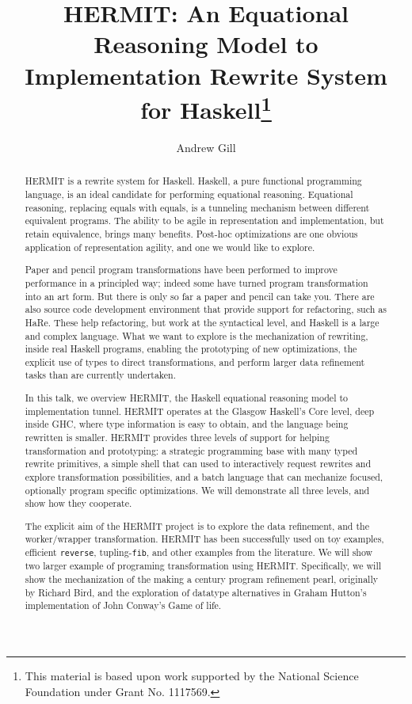 \documentclass[a4paper,UKenglish]{oasics}
\title{HERMIT: An Equational Reasoning Model to Implementation Rewrite System for Haskell\footnote{This material is based upon work supported by the National Science Foundation under Grant No. 1117569.}}
\author[1]{Andrew Gill}
\affil[1]{Information Technology and Telecommunication Center,\\
Department of Electrical Engineering and Computer Science,\\
The University of Kansas, USA\\
\texttt{andygill@ku.edu}}
\begin{document}
\maketitle

\begin{abstract}
HERMIT is a rewrite system for Haskell.
%
Haskell, a pure functional programming language,
is an ideal candidate for performing equational reasoning.
%
Equational reasoning, replacing equals with equals,
is a tunneling mechanism between different equivalent programs.
%
The ability to be agile in representation and implementation,
but retain equivalence, brings many benefits. Post-hoc 
optimizations are one obvious application of representation
agility, and one we would like to explore.

Paper and pencil program transformations have been performed
to improve performance in a principled way; indeed some
have turned program transformation into an art form.
But there is only so far a paper and pencil can take you.
%
There are also source code development environment
that provide support for refactoring, such as HaRe.
These help refactoring, but work at the syntactical
level, and Haskell is a large and complex language.
%
What we want to explore is the mechanization of rewriting, 
inside real Haskell programs, enabling the prototyping
of new optimizations, the explicit use of types to direct
transformations, and perform larger data refinement tasks
than are currently undertaken.

In this talk, we overview HERMIT, the Haskell
equational reasoning model to implementation tunnel.
%
HERMIT operates at the Glasgow Haskell's Core level,
deep inside GHC, where type information is easy to
obtain, and the language being rewritten is smaller.
%
HERMIT provides three levels of support for helping
transformation and prototyping: a strategic programming
base with many typed rewrite primitives, a simple
shell that can used to interactively request rewrites
and explore transformation possibilities, and a batch
language that can mechanize focused, optionally
program specific optimizations.
%
We will demonstrate all three levels, and show how they cooperate.

The explicit aim of the HERMIT project is to explore the data refinement,
and the worker/wrapper transformation.
%
HERMIT has been successfully used on toy examples, efficient \verb|reverse|,
tupling-\verb|fib|, and other examples from the literature.
We will show two larger example of programing transformation using HERMIT.
Specifically, we will show the mechanization of 
the making a century program refinement pearl, originally by Richard Bird,
and the exploration of datatype alternatives in Graham Hutton's 
implementation of John Conway's Game of life.
\end{abstract}
\end{document}
